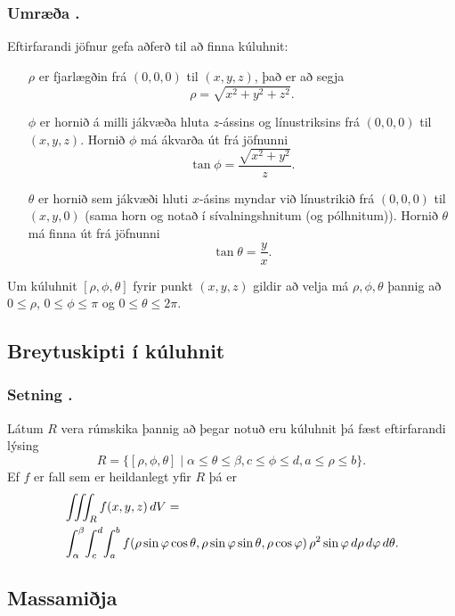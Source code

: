 \subsubsection{Umræða \kaflanr.}
Eftirfarandi jöfnur gefa aðferð til að finna kúluhnit:
\begin{itemize}
\item[$\rho$]  er fjarlægðin frá $(0,0,0)$ til $(x,y,z)$, það er að segja 
$$\rho=\sqrt{x^2+y^2+z^2}.$$
\item[$\phi$] er hornið á milli jákvæða hluta $z$-ássins og línustriksins frá $(0,0,0)$ til $(x,y,z)$.  Hornið $\phi$ má ákvarða út frá jöfnunni
$$\tan\phi=\frac{\sqrt{x^2+y^2}}{z}.$$
\item[$\theta$] er hornið sem jákvæði hluti $x$-ásins myndar við línustrikið frá $(0,0,0)$ til $(x,y,0)$ (sama horn og notað í sívalningshnitum (og pólhnitum)).   Hornið $\theta$ má finna út frá jöfnunni
$$\tan\theta=\frac{y}{x}.$$
\end{itemize}
Um kúluhnit $[\rho, \phi, \theta]$ fyrir punkt $(x,y,z)$ gildir að 
velja má $\rho, \phi, \theta$ þannig að
$0\leq \rho$, $0\leq\phi\leq \pi$ og $0\leq\theta\leq 2\pi$.




\subsection{Breytuskipti í kúluhnit} 

\subsubsection{Setning \kaflanr.}
 Látum $R$ vera rúmskika þannig að þegar notuð eru kúluhnit þá fæst eftirfarandi lýsing
$$R=\{[\rho,\phi,\theta]\mid \alpha\leq\theta\leq\beta, 
c\leq\phi\leq d, a\leq \rho\leq b\}.$$ 
Ef $f$ er fall sem er heildanlegt yfir $R$ þá er
\begin{align*}&\thrint_R f(x,y,z)\,dV=\\ &\int_\alpha^\beta\!\int_c^d\!\int_a^b f(\rho\sin\phi\cos\theta, \rho\sin\phi\sin\theta,\rho\cos\phi)
\,\rho^2\sin\phi\,d\rho\,d\phi\,d\theta.
\end{align*}




\subsection{Massamiðja} 

